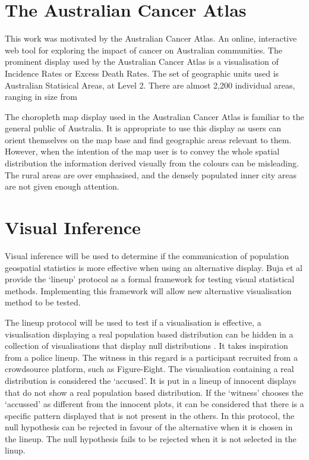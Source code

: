 \documentclass{monashthesis}
\begin{document}
\hypertarget{the-australian-cancer-atlas}{%
\section{The Australian Cancer Atlas}\label{the-australian-cancer-atlas}}

This work was motivated by the Australian Cancer Atlas. An online, interactive web tool for exploring the impact of cancer on Australian communities. The prominent display used by the Australian Cancer Atlas is a visualisation of Incidence Rates or Excess Death Rates. The set of geographic units used is Australian Statisical Areas, at Level 2. There are almost 2,200 individual areas, ranging in size from

The choropleth map display used in the Australian Cancer Atlas is familiar to the general public of Australia. It is appropriate to use this display as users can orient themselves on the map base and find geographic areas relevant to them.
However, when the intention of the map user is to convey the whole spatial distribution the information derived visually from the colours can be misleading.
The rural areas are over emphasised, and the densely populated inner city areas are not given enough attention.

\hypertarget{visual-inference}{%
\section{Visual Inference}\label{visual-inference}}

Visual inference will be used to determine if the communication of population geospatial statistics is more effective when using an alternative display.
Buja et al \autocite{GIIV} provide the `lineup' protocol as a formal framework for testing visual statistical methods. Implementing this framework will allow new alternative visualisation method to be tested.

The lineup protocol will be used to test if a visualisation is effective, a visualisation displaying a real population based distribution can be hidden in a collection of visualisations that display null distributions \autocite{chowd}.
It takes inspiration from a police lineup.
The witness in this regard is a participant recruited from a crowdsource platform, such as Figure-Eight.
The visualisation containing a real distribution is considered the `accused'.
It is put in a lineup of innocent displays that do not show a real population based distribution.
If the `witness' chooses the `accussed' as different from the innocent plots, it can be considered that there is a specific pattern displayed that is not present in the others.
In this protocol, the null hypothesis can be rejected in favour of the alternative when it is chosen in the lineup. The null hypothesis fails to be rejected when it is not selected in the linup.
\end{document}

